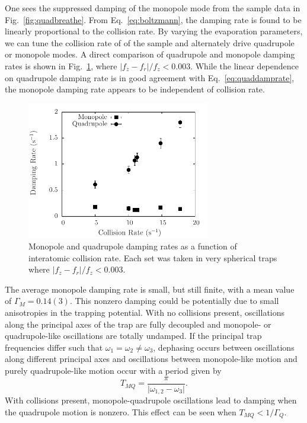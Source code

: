\documentclass[%
 reprint,
 amsmath,amssymb,
 aps,
]{revtex4-1}
\begin{document}
One sees the suppressed damping of the monopole mode from the sample data in Fig.~\ref{fig:quadbreathe}. From Eq.~\ref{eq:boltzmann}, the damping rate is found to be linearly proportional to the collision rate. 
By varying the evaporation parameters, we can tune the collision rate of of the sample and alternately drive quadrupole or monopole modes.
A direct comparison of quadrupole and monopole damping rates is shown in Fig.~\ref{fig:qbdamp}, where $\vert f_z-f_r\vert/f_z < 0.003$.
While the linear dependence on quadrupole damping rate is in good agreement with Eq.~\ref{eq:quaddamprate}, the monopole damping rate appears to be independent of collision rate.
\begin{figure}[htbl!]
    \begin{center}
    \includegraphics[width=80mm]{./figs/QuadBreathevsCollf3.pdf}
    \end{center}
    \caption[qbdamp]{
        Monopole and quadrupole damping rates as a function of interatomic collision rate. Each set was taken in very spherical traps where $\vert f_z-f_r\vert/f_z < 0.003$.
    }
    \label{fig:qbdamp}
\end{figure}

The average monopole damping rate is small, but still finite, with a mean value of $\Gamma_M = 0.14(3)$. This nonzero damping could be potentially due to small anisotropies in the trapping potential. With no collisions present, oscillations along the principal axes of the trap are fully decoupled and monopole- or quadrupole-like oscillations are totally undamped. If the principal trap frequencies differ such that $\omega_1=\omega_2\neq\omega_3$, dephasing occurs between oscillations along different principal axes and oscillations between monopole-like motion and purely quadrupole-like motion occur with a period given by
\begin{equation}
T_{MQ} = \frac{\pi}{\vert\omega_{1,2}-\omega_3\vert}.
\end{equation}
With collisions present, monopole-quadrupole oscillations lead to damping when the quadrupole motion is nonzero. This effect can be seen when $T_{MQ} < 1/\Gamma_Q$.
\end{document}
